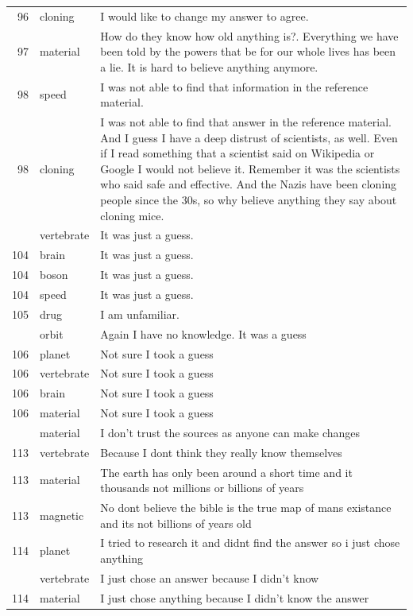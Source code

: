 \documentclass[
  doc,floatsintext]{apa6}
\begin{document}
\begin{longtable}[t]{>{}r>{}l>{\raggedright\arraybackslash}p{30em}}
96 & cloning & I would like to change my answer to agree.\\
97 & material & How do they know how old anything is?.  Everything we have been told by the powers that be for our whole lives has been a lie.  It is hard to believe anything anymore.\\
98 & speed & I was not able to find that information in the reference material.\\
98 & cloning & I was not able to find that answer in the reference material. And I guess I have a deep distrust of scientists, as well. Even if I read something that a scientist said on Wikipedia or Google I would not believe it. Remember it was the scientists who said safe and effective. And the Nazis have been cloning people since the 30s, so why believe anything they say about cloning mice.\\
\addlinespace
104 & vertebrate & It was just a guess.\\
104 & brain & It was just a guess.\\
104 & boson & It was just a guess.\\
104 & speed & It was just a guess.\\
105 & drug & I am unfamiliar.\\
\addlinespace
105 & orbit & Again I have no knowledge. It was a guess\\
106 & planet & Not sure I took a guess\\
106 & vertebrate & Not sure I took a guess\\
106 & brain & Not sure I took a guess\\
106 & material & Not sure I took a guess\\
\addlinespace
108 & material & I don’t trust the sources as anyone can make changes\\
113 & vertebrate & Because I dont think they really know themselves\\
113 & material & The earth has only been around a short time and it thousands not millions or billions of years\\
113 & magnetic & No dont believe the bible is the true map of mans existance and its not billions of years old\\
114 & planet & I tried to research it and didnt find the answer so i just chose anything\\
\addlinespace
114 & vertebrate & I just chose an answer because I didn't know\\
114 & material & I just chose anything because I didn't know the answer\\

\end{longtable}
\end{document}
